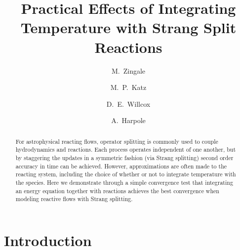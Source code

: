 \documentclass[times,preprint]{aastex63}
\begin{document}
\title{Practical Effects of Integrating Temperature with Strang Split Reactions}



\shortauthors{}

\author[0000-0001-8401-030X]{M.~Zingale}

\author[0000-0003-0439-4556]{M.~P.~Katz}

\author[0000-0003-2300-5165]{D.\ E.\ Willcox}

\author[0000-0002-1530-781X]{A.\ Harpole}



\begin{abstract}
For astrophysical reacting flows, operator splitting is commonly used
to couple hydrodynamics and reactions.  Each process operates
independent of one another, but by staggering the updates in a
symmetric fashion (via Strang splitting) second order accuracy in time
can be achieved.  However, approximations are often made to the
reacting system, including the choice of whether or not to integrate
temperature with the species.  Here we demonstrate through a simple
convergence test that integrating an energy equation together with reactions
achieves the best convergence when modeling reactive flows with Strang
splitting.
\end{abstract}


\section{Introduction}\label{Sec:Introduction}
\end{document}
